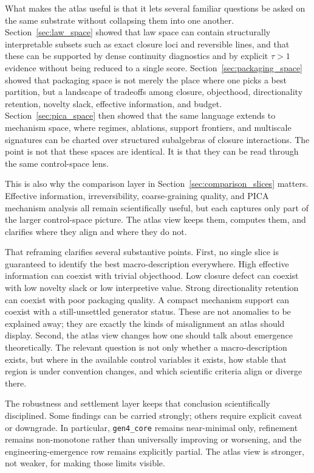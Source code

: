 \documentclass[11pt]{article}
\theoremstyle{definition}
\begin{document}
What makes the atlas useful is that it lets several familiar questions be asked on the same substrate without collapsing them into one another. Section~\ref{sec:law_space} showed that law space can contain structurally interpretable subsets such as exact closure loci and reversible lines, and that these can be supported by dense continuity diagnostics and by explicit $\tau>1$ evidence without being reduced to a single score. Section~\ref{sec:packaging_space} showed that packaging space is not merely the place where one picks a best partition, but a landscape of tradeoffs among closure, objecthood, directionality retention, novelty slack, effective information, and budget. Section~\ref{sec:pica_space} then showed that the same language extends to mechanism space, where regimes, ablations, support frontiers, and multiscale signatures can be charted over structured subalgebras of closure interactions. The point is not that these spaces are identical. It is that they can be read through the same control-space lens.

This is also why the comparison layer in Section~\ref{sec:comparison_slices} matters. Effective information, irreversibility, coarse-graining quality, and PICA mechanism analysis all remain scientifically useful, but each captures only part of the larger control-space picture. The atlas view keeps them, computes them, and clarifies where they align and where they do not.

That reframing clarifies several substantive points. First, no single slice is guaranteed to identify the best macro-description everywhere. High effective information can coexist with trivial objecthood. Low closure defect can coexist with low novelty slack or low interpretive value. Strong directionality retention can coexist with poor packaging quality. A compact mechanism support can coexist with a still-unsettled generator status. These are not anomalies to be explained away; they are exactly the kinds of misalignment an atlas should display. Second, the atlas view changes how one should talk about emergence theoretically. The relevant question is not only whether a macro-description exists, but where in the available control variables it exists, how stable that region is under convention changes, and which scientific criteria align or diverge there.

The robustness and settlement layer keeps that conclusion scientifically disciplined. Some findings can be carried strongly; others require explicit caveat or downgrade. In particular, \texttt{gen4\_core} remains near-minimal only, refinement remains non-monotone rather than universally improving or worsening, and the engineering-emergence row remains explicitly partial. The atlas view is stronger, not weaker, for making those limits visible.
\end{document}
